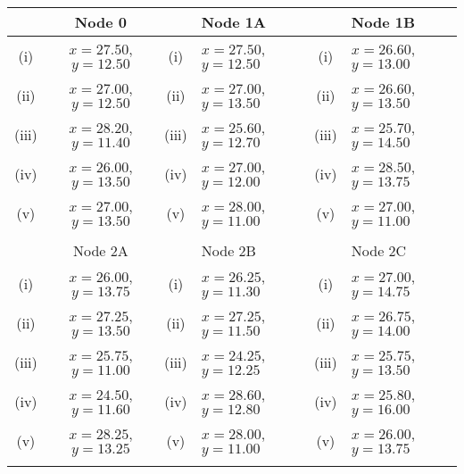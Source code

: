 	\normalsize	
				\begin{tabular}{||c|c||c|l||c|l||}
					\hline  & Node 0 &   & Node 1A &  & Node 1B     \\  \hline
					\hline (i) & $x= 27.50$, $y= 12.50$ & (i) & $x= 27.50$, $y = 12.50$ &  (i)  & $x= 26.60$, $y= 13.00$\\  \hline
					\hline (ii)  & $x= 27.00$, $y =12.50 $  &  (ii) & $x= 27.00$, $y = 13.50$ & (ii) & $x= 26.60$, $y = 13.50 $ \\  \hline
					\hline (iii) & $x= 28.20$, $y = 11.40$  & (iii) & $x= 25.60$, $y = 12.70 $ & (iii) & $x= 25.70$, $y = 14.50$ \\  \hline
					\hline (iv)  & $x= 26.00$, $y = 13.50$  &  (iv) & $x= 27.00$, $y = 12.00$  & (iv)  & $x= 28.50$, $y= 13.75$\\  \hline
					\hline (v) & $x= 27.00$, $y = 13.50$ & (v)  & $x= 28.00$, $y= 11.00$ & (v) & $x= 27.00$, $y = 11.00$\\  \hline & & & & & \\
					\hline 
		
					\hline  & Node 2A &   & Node 2B &  & Node 2C  \\  \hline
					\hline (i) & $x= 26.00$, $y= 13.75$ & (i)  & $x= 26.25 $, $y = 11.30 $  & (i)  & $x= 27.00$, $y = 14.75$\\  \hline
					\hline (ii)  & $x= 27.25$, $y = 13.50$  &  (ii) &$x= 27.25$, $y = 11.50$ & (ii) & $x= 26.75$, $y = 14.00 $ \\  \hline
					\hline (iii) & $x= 25.75  $, $y = 11.00 $  &  (iii) &$x= 24.25 $, $y = 12.25 $ &  (iii) & $x= 25.75$, $y = 13.50$ \\  \hline
					\hline (iv)  & $x= 24.50$, $y = 11.60 $  & (iv) & $x= 28.60 $, $y = 12.80 $ & (iv)  & $x= 25.80$, $y = 16.00$\\  \hline
					\hline (v) & $x= 28.25 $, $y = 13.25 $ & (v) & $x= 28.00$, $y= 11.00$  &(v) & $x= 26.00$, $y = 13.75$\\  \hline & & & & & \\
					\hline 
							\end{tabular} 
									\newpage	
